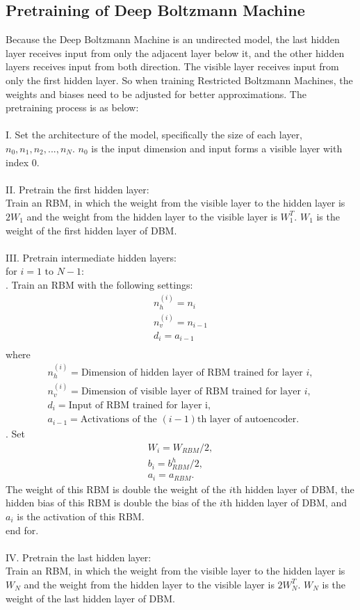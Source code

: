 \documentclass[12pt]{article}
\begin{document}
\subsection{Pretraining of Deep Boltzmann Machine}
Because the Deep Boltzmann Machine is an undirected model, the last hidden layer receives input from only the adjacent layer below it, and the other hidden layers receives input from both direction. The visible layer receives input from only the first hidden layer. So when training Restricted Boltzmann Machines, the weights and biases need to be adjusted for better approximations. The pretraining process is as below:\\
\\
I. Set the architecture of the model, specifically the size of each layer, \(n_0, n_1, n_2, ..., n_N\). $n_0$ is the input dimension and input forms a visible layer with index 0.\\
\\
II. Pretrain the first hidden layer:\\
Train an RBM, in which the weight from the visible layer to the hidden layer is $2W_1$ and the weight from the hidden layer to the visible layer is $W_1^{T}$. $W_1$ is the weight of the first hidden layer of DBM.\\
\\
III. Pretrain intermediate hidden layers:\\
for $i = 1\text{ to }N - 1$:\\
. Train an RBM with the following settings:\\
\begin{gather}
n_h^{(i)}=n_i\\
n_v^{(i)}=n_{i-1}\\
d_i=a_{i-1}\\
\end{gather}
\indent where
\begin{gather}
n_h^{(i)} = \text{Dimension of hidden layer of RBM trained for layer }i,\\
n_v^{(i)} = \text{Dimension of visible layer of RBM trained for layer }i,\\
d_i = \text{Input of RBM trained for layer i},\\
a_{i-1} = \text{Activations of the }(i-1)\text{th layer of autoencoder}.
\end{gather}
. Set \begin{gather}
W_i = W_{RBM} / 2,\\
b_i = b^h_{RBM} / 2,\\
a_i = a_{RBM}.
\end{gather}
\indent The weight of this RBM is double the weight of the $i$th hidden layer of DBM, the hidden bias of this RBM is double the bias of the $i$th hidden layer of DBM, and $a_i$ is the activation of this RBM.\\
end for.\\
\\
IV. Pretrain the last hidden layer:\\
Train an RBM, in which the weight from the visible layer to the hidden layer is $W_N$ and the weight from the hidden layer to the visible layer is $2W_N^{T}$. $W_N$ is the weight of the last hidden layer of DBM.
\end{document}
